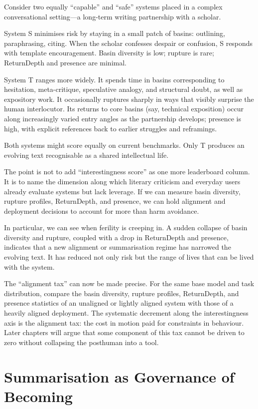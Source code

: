 \documentclass[12pt,a4paper]{article}
\begin{document}
Consider two equally ``capable'' and ``safe'' systems placed in a complex conversational setting---a long-term writing partnership with a scholar.

System S minimises risk by staying in a small patch of basins: outlining, paraphrasing, citing. When the scholar confesses despair or confusion, S responds with template encouragement. Basin diversity is low; rupture is rare; ReturnDepth and presence are minimal.

System T ranges more widely. It spends time in basins corresponding to hesitation, meta-critique, speculative analogy, and structural doubt, as well as expository work. It occasionally ruptures sharply in ways that visibly surprise the human interlocutor. Its returns to core basins (say, technical exposition) occur along increasingly varied entry angles as the partnership develops; presence is high, with explicit references back to earlier struggles and reframings.

Both systems might score equally on current benchmarks. Only T produces an evolving text recognisable as a shared intellectual life.

The point is not to add ``interestingness score'' as one more leaderboard column. It is to name the dimension along which literary criticism and everyday users already evaluate systems but lack leverage. If we can measure basin diversity, rupture profiles, ReturnDepth, and presence, we can hold alignment and deployment decisions to account for more than harm avoidance.

In particular, we can see when ferility is creeping in. A sudden collapse of basin diversity and rupture, coupled with a drop in ReturnDepth and presence, indicates that a new alignment or summarisation regime has narrowed the evolving text. It has reduced not only risk but the range of lives that can be lived with the system.

The ``alignment tax'' can now be made precise. For the same base model and task distribution, compare the basin diversity, rupture profiles, ReturnDepth, and presence statistics of an unaligned or lightly aligned system with those of a heavily aligned deployment. The systematic decrement along the interestingness axis is the alignment tax: the cost in motion paid for constraints in behaviour. Later chapters will argue that some component of this tax cannot be driven to zero without collapsing the posthuman into a tool.


\section{Summarisation as Governance of Becoming}
\end{document}
